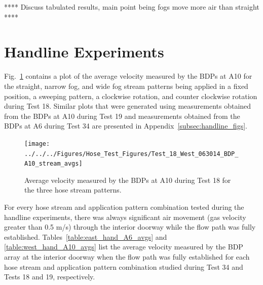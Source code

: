\documentclass[12pt,oneside]{book}
\begin{document}
**** Discuss tabulated results, main point being fogs move more air than straight ****

\section{Handline Experiments}
\label{sec:handline_results}

Fig.~\ref{fig:Test_18_BDP_A10_Avg_All} contains a plot of the average velocity measured by the BDPs at A10 for the straight, narrow fog, and wide fog stream patterns being applied in a fixed position, a sweeping pattern, a clockwise rotation, and counter clockwise rotation during Test 18. Similar plots that were generated using measurements obtained from the BDPs at A10 during Test 19 and measurements obtained from the BDPs at A6 during Test 34 are presented in Appendix~\ref{subsec:handline_figs}.

\begin{figure}[!ht]
\texttt{[image: ../../../Figures/Hose\_Test\_Figures/Test\_18\_West\_063014\_BDP\_A10\_stream\_avgs]}
\caption{Average velocity measured by the BDPs at A10 during Test 18 for the three hose stream patterns.}
\label{fig:Test_18_BDP_A10_Avg_All}
\end{figure}

\FloatBarrier

For every hose stream and application pattern combination tested during the handline experiments, there was always significant air movement (gas velocity greater than 0.5 m/s) through the interior doorway while the flow path was fully established. Tables~\ref{table:east_hand_A6_avgs} and \ref{table:west_hand_A10_avgs} list the average velocity measured by the BDP array at the interior doorway when the flow path was fully established for each hose stream and application pattern combination studied during Test 34 and Tests 18 and 19, respectively.

\end{document}
